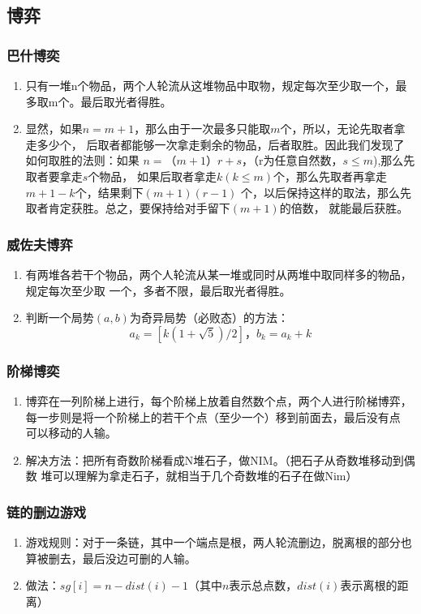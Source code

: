 \subsection{博弈}
\subsubsection{巴什博奕}
	\begin{enumerate}
		\item 
			只有一堆n个物品，两个人轮流从这堆物品中取物，规定每次至少取一个，最多取m个。最后取光者得胜。
		\item
			显然，如果$n=m+1$，那么由于一次最多只能取$m$个，所以，无论先取者拿走多少个，
			后取者都能够一次拿走剩余的物品，后者取胜。因此我们发现了如何取胜的法则：如果
			$n=（m+1）r+s$，（r为任意自然数，$s \leq m$),那么先取者要拿走$s$个物品，
			如果后取者拿走$k(k \leq m)$个，那么先取者再拿走$m+1-k$个，结果剩下$(m+1)(r-1)$
			个，以后保持这样的取法，那么先取者肯定获胜。总之，要保持给对手留下$(m+1)$的倍数，
			就能最后获胜。
	\end{enumerate}
\subsubsection{威佐夫博弈}
	\begin{enumerate}
		\item 
			有两堆各若干个物品，两个人轮流从某一堆或同时从两堆中取同样多的物品，规定每次至少取
			一个，多者不限，最后取光者得胜。
		\item
			判断一个局势$(a, b)$为奇异局势（必败态）的方法：
			$$a_k =[k (1+\sqrt{5})/2]，b_k= a_k + k$$
	\end{enumerate}
\subsubsection{阶梯博奕}
	\begin{enumerate}
		\item
			博弈在一列阶梯上进行，每个阶梯上放着自然数个点，两个人进行阶梯博弈，
			每一步则是将一个阶梯上的若干个点（至少一个）移到前面去，最后没有点
			可以移动的人输。
		\item
			解决方法：把所有奇数阶梯看成N堆石子，做NIM。（把石子从奇数堆移动到偶数
			堆可以理解为拿走石子，就相当于几个奇数堆的石子在做Nim）
	\end{enumerate}
	\subsubsection{链的删边游戏}
		\begin{enumerate}
			\item
				游戏规则：对于一条链，其中一个端点是根，两人轮流删边，脱离根的部分也算被删去，最后没边可删的人输。
			\item
				做法：$sg[i] = n - dist(i) - 1$（其中$n$表示总点数，$dist(i)$表示离根的距离）
		\end{enumerate}
